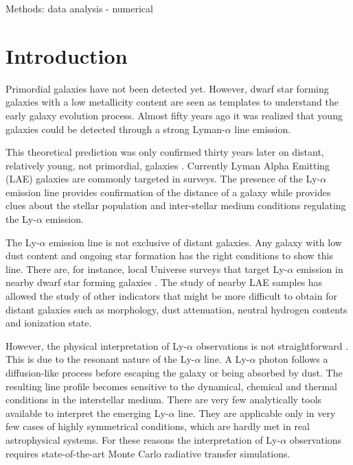 \documentclass[a4,useAMS,usenatbib,usegraphicx]{mn2e}
\begin{document}
\begin{keywords}
Methods: data analysis - numerical 
\end{keywords}



\section{Introduction}
\label{sec:introduction}





Primordial galaxies have not been detected yet. 
However, dwarf star forming galaxies with a low metallicity content
are seen as templates to understand the early galaxy evolution process. 
Almost fifty years ago \citep{PartridgePeebles} it was realized that
young galaxies could be detected through a strong Lyman-$\alpha$ line
emission.  


This theoretical prediction was only confirmed thirty years later on
distant, relatively young, not primordial, galaxies \citep{1998ApJ...498L..93D}.
Currently Lyman Alpha Emitting (LAE) galaxies are commonly targeted
in surveys. 
The presence of the Ly-$\alpha$ emission line provides confirmation of
the distance of a galaxy while provides clues about the stellar
population and inter-stellar medium conditions regulating the
Ly-$\alpha$ emission. 

The Ly-$\alpha$ emission line is not exclusive of distant galaxies. 
Any galaxy with low dust content and ongoing star formation has the
right conditions to show this line.  
There are, for instance,  local Universe surveys that target
Ly-$\alpha$ emission in nearby dwarf star forming galaxies 
\citep{LARS}. 
The study of nearby LAE samples has allowed the study of other
indicators that might be more difficult to obtain for distant galaxies
such as morphology, dust attenuation, neutral hydrogen contents and
ionization state.  

However, the physical interpretation of Ly-$\alpha$ observations is
not straightforward \citep{2015ApJ...805...14R}. 
This is due to the resonant nature of the Ly-$\alpha$ line. 
A Ly-$\alpha$ photon follows a diffusion-like process before escaping
the galaxy or being absorbed by dust. 
The resulting line profile becomes sensitive to the dynamical, chemical
and thermal conditions in the interstellar medium. 
There are very few analytically tools available to interpret the
emerging Ly-$\alpha$ line.
They are applicable only in very few cases of highly symmetrical
conditions, which are hardly met in real astrophysical systems.
For these reasons the interpretation of Ly-$\alpha$ observations
requires state-of-the-art Monte Carlo radiative transfer simulations.   
\end{document}
